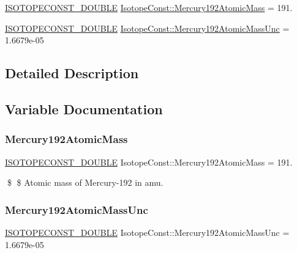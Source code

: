 \begin{DoxyCompactItemize}
\item 
\mbox{\hyperlink{group___isotope_const-_macros_ga8f45a7272ce02c0b4c65c44636ed719a}{I\+S\+O\+T\+O\+P\+E\+C\+O\+N\+S\+T\+\_\+\+D\+O\+U\+B\+LE}} \mbox{\hyperlink{group___isotope_const-_mercury-_hg192_ga3847977ac66ad742e39cd3c416c69030}{Isotope\+Const\+::\+Mercury192\+Atomic\+Mass}} = 191.
\item 
\mbox{\hyperlink{group___isotope_const-_macros_ga8f45a7272ce02c0b4c65c44636ed719a}{I\+S\+O\+T\+O\+P\+E\+C\+O\+N\+S\+T\+\_\+\+D\+O\+U\+B\+LE}} \mbox{\hyperlink{group___isotope_const-_mercury-_hg192_ga411ba57e46172d590565dce58c5494a5}{Isotope\+Const\+::\+Mercury192\+Atomic\+Mass\+Unc}} = 1.\+6679e-\/05
\end{DoxyCompactItemize}


\subsection{Detailed Description}


\subsection{Variable Documentation}
\mbox{\label{group___isotope_const-_mercury-_hg192_ga3847977ac66ad742e39cd3c416c69030}} 
\subsubsection{\texorpdfstring{Mercury192\+Atomic\+Mass}{Mercury192AtomicMass}}
{\footnotesize\ttfamily \mbox{\hyperlink{group___isotope_const-_macros_ga8f45a7272ce02c0b4c65c44636ed719a}{I\+S\+O\+T\+O\+P\+E\+C\+O\+N\+S\+T\+\_\+\+D\+O\+U\+B\+LE}} Isotope\+Const\+::\+Mercury192\+Atomic\+Mass = 191.}

\$ \$ Atomic mass of Mercury-\/192 in amu. \mbox{\label{group___isotope_const-_mercury-_hg192_ga411ba57e46172d590565dce58c5494a5}} 
\subsubsection{\texorpdfstring{Mercury192\+Atomic\+Mass\+Unc}{Mercury192AtomicMassUnc}}
{\footnotesize\ttfamily \mbox{\hyperlink{group___isotope_const-_macros_ga8f45a7272ce02c0b4c65c44636ed719a}{I\+S\+O\+T\+O\+P\+E\+C\+O\+N\+S\+T\+\_\+\+D\+O\+U\+B\+LE}} Isotope\+Const\+::\+Mercury192\+Atomic\+Mass\+Unc = 1.\+6679e-\/05}


